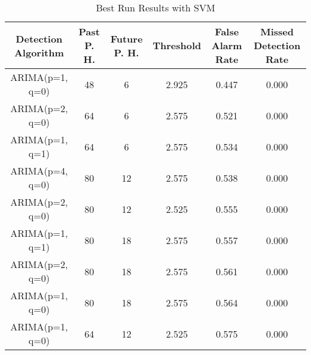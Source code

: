 \begin{table*}[h!]
\centering
\caption{Best Run Results with SVM}
    \label{table:svmbest}
    \begin{tabular}{|c|c|c|c|c|c|}
        \hline
        Detection Algorithm & Past P. H. & Future P. H. & Threshold & False Alarm Rate & Missed Detection Rate \\
        \hline
        \hline
        ARIMA(p=1, q=0) & 48 & 6 & 2.925 &  0.447 & 0.000 \\
        \hline
        ARIMA(p=2, q=0) & 64 & 6 & 2.575 &  0.521 & 0.000 \\
        \hline
        ARIMA(p=1, q=1) & 64 & 6 & 2.575 &  0.534 & 0.000 \\
        \hline
        ARIMA(p=4, q=0) & 80 & 12 & 2.575 &  0.538 & 0.000 \\
        \hline
        ARIMA(p=2, q=0) & 80 & 12 & 2.525 &  0.555 & 0.000 \\
        \hline
        ARIMA(p=1, q=1) & 80 & 18 & 2.575 &  0.557 & 0.000 \\
        \hline
        ARIMA(p=2, q=0) & 80 & 18 & 2.575 &  0.561 & 0.000 \\
        \hline
        ARIMA(p=1, q=0) & 80 & 18 & 2.575 &  0.564 & 0.000 \\
        \hline
        ARIMA(p=1, q=0) & 64 & 12 & 2.525 &  0.575 & 0.000 \\
        \hline
    \end{tabular}
\end{table*}
